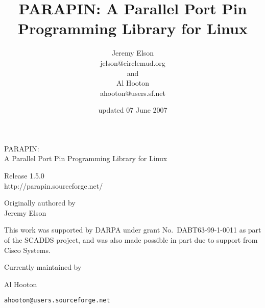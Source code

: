 \documentclass{article}
\title{PARAPIN:
A Parallel Port Pin Programming Library for Linux}
\author{Jeremy Elson\\
jelson@circlemud.org\\
and\\
Al Hooton\\
ahooton@users.sf.net}
\date{updated 07 June 2007}
\begin{document}

\begin{center}
\begin{latexonly}\vspace*{1in}\end{latexonly}
{\Huge PARAPIN:} \\
\vspace{2\baselineskip}
{\huge A Parallel Port Pin Programming Library for Linux}

{\Large Release 1.5.0 \\
\vspace{2\baselineskip}
http://parapin.sourceforge.net/}

\begin{latexonly}\vspace{0.5in}\end{latexonly}
\vspace{\baselineskip}

{\Large Originally authored by \\
Jeremy Elson \\
\begin{latexonly}\vspace{.5\baselineskip}\end{latexonly}

\vfill

This work was supported by DARPA under grant No.\ DABT63-99-1-0011 as
part of the SCADDS project, and was also made possible in part due to
support from Cisco Systems.

\vfill


\begin{latexonly}\vspace{1in}\end{latexonly}
Currently maintained by \\
{\Large Al Hooton \\
\begin{latexonly}\vspace{.5\baselineskip}\end{latexonly}
{\tt ahooton@users.sourceforge.net}}}
\end{center}
\thispagestyle{empty}
\clearpage

\begin{latexonly}

\tableofcontents
\clearpage
\end{latexonly}
\end{document}
